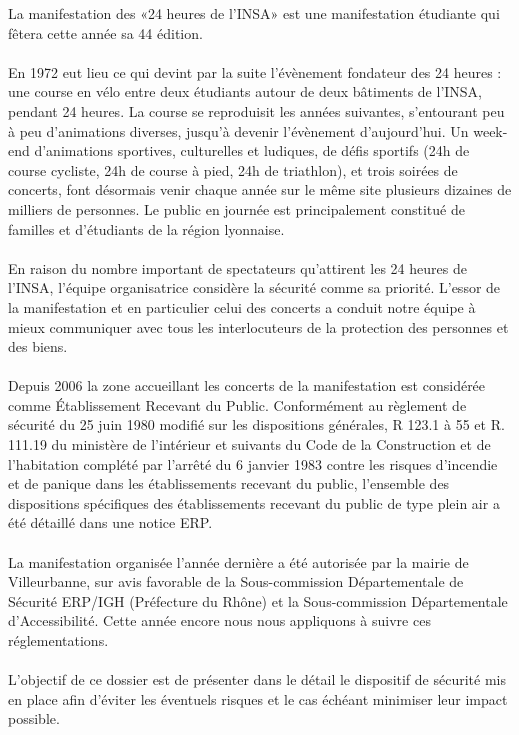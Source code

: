 \documentclass[hidelinks, paper=a4, fontsize=13pt]{report}
\begin{document}
La manifestation des «24 heures de l’INSA» est une manifestation étudiante qui fêtera cette année sa 44  édition. \\\\
En 1972 eut lieu ce qui devint par la suite l’évènement fondateur des 24 heures : une course en vélo entre deux étudiants autour de deux bâtiments de l’INSA, pendant 24 heures. La course se reproduisit les années suivantes, s’entourant peu à peu d’animations diverses, jusqu'à devenir l’évènement d’aujourd'hui. Un week-end d’animations sportives, culturelles et ludiques, de défis sportifs (24h de course cycliste, 24h de course à pied, 24h de triathlon), et trois soirées de concerts, font désormais venir chaque année sur le même site plusieurs dizaines de milliers de personnes. Le public en journée est principalement constitué de familles et d’étudiants de la région lyonnaise. \\\\
En raison du nombre important de spectateurs qu’attirent les 24 heures de l'INSA, l'équipe organisatrice considère la sécurité comme sa priorité. L'essor de la manifestation et en particulier celui des concerts a conduit notre équipe à mieux communiquer avec tous les interlocuteurs de la protection des personnes et des biens.\\\\
Depuis 2006 la zone accueillant les concerts de la manifestation est considérée comme Établissement Recevant du Public. Conformément au règlement de sécurité du 25 juin 1980 modifié sur les dispositions générales, R 123.1 à 55 et R. 111.19 du ministère de l’intérieur et suivants du Code de la Construction et de l’habitation complété par l’arrêté du 6 janvier 1983 contre les risques d’incendie et de panique dans les établissements recevant du public, l’ensemble des dispositions spécifiques des établissements recevant du public de type plein air a été détaillé dans une notice ERP.\\\\
La manifestation organisée l’année dernière a été autorisée par la mairie de Villeurbanne, sur avis favorable de la Sous-commission Départementale de Sécurité ERP/IGH (Préfecture du Rhône) et la Sous-commission Départementale d’Accessibilité. Cette année encore nous nous appliquons à suivre ces réglementations.\\\\
L'objectif de ce dossier est de présenter dans le détail le dispositif de sécurité mis en place afin d'éviter les éventuels risques et le cas échéant minimiser leur impact possible. \\\\
\end{document}
